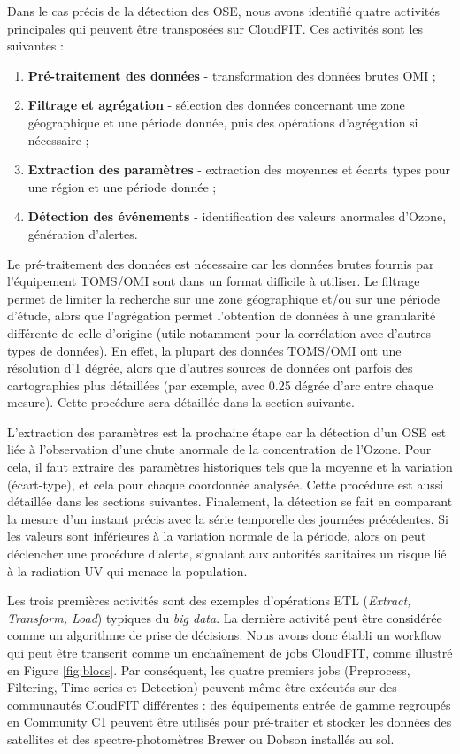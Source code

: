 Dans le cas précis de la détection des OSE, nous avons identifié quatre activités principales qui peuvent être transposées sur CloudFIT. Ces activités sont les suivantes : 
\begin{enumerate}
	\item \textbf{Pré-traitement des données} - transformation des données brutes OMI ;
	\item \textbf{Filtrage et agrégation} - sélection des données concernant une zone géographique et une période donnée, puis des opérations d'agrégation si nécessaire ;
	\item \textbf{Extraction des paramètres} - extraction des moyennes et écarts types pour une région et une période donnée ;
	\item \textbf{Détection des événements} - identification des valeurs anormales d'Ozone, génération d'alertes.
\end{enumerate}

Le pré-traitement des données est nécessaire car les données brutes fournis par l'équipement TOMS/OMI sont dans un format difficile à utiliser. Le filtrage permet de limiter la recherche sur une zone géographique et/ou sur une période d'étude, alors que l'agrégation permet l'obtention de données à une granularité différente de celle d'origine (utile notamment pour la corrélation avec d'autres types de données). En effet, la plupart des données TOMS/OMI ont une résolution d'1 dégrée, alors que d'autres sources de données ont parfois des cartographies plus détaillées (par exemple, avec 0.25 dégrée d'arc entre chaque mesure). Cette procédure sera détaillée dans la section suivante.

L'extraction des paramètres est la prochaine étape car la détection d'un OSE est liée à l'observation d'une chute anormale de la concentration de l'Ozone. Pour cela, il faut extraire des paramètres historiques tels que la moyenne et la variation (écart-type), et cela pour chaque coordonnée analysée. Cette procédure est aussi détaillée dans les sections suivantes. Finalement, la détection se fait en comparant la mesure d'un instant précis avec la série temporelle des journées précédentes. Si les valeurs sont inférieures à la variation normale de la période, alors on peut déclencher une procédure d'alerte, signalant aux autorités sanitaires un risque lié à la radiation UV qui menace la population.

Les trois premières activités sont des exemples d'opérations ETL (\textit{Extract, Transform, Load}) typiques du \textit{big data}. La dernière activité peut être considérée comme un algorithme de prise de décisions. Nous avons donc établi un workflow qui peut être transcrit comme un enchaînement de jobs CloudFIT, comme illustré en Figure \ref{fig:blocs}. Par conséquent, les quatre premiers jobs (Preprocess, Filtering, Time-series et Detection) peuvent même être exécutés sur des communautés CloudFIT différentes : des équipements entrée de gamme regroupés en Community C1 peuvent être utilisés pour pré-traiter et stocker les données des satellites et des spectre-photomètres Brewer ou Dobson installés au sol. 

